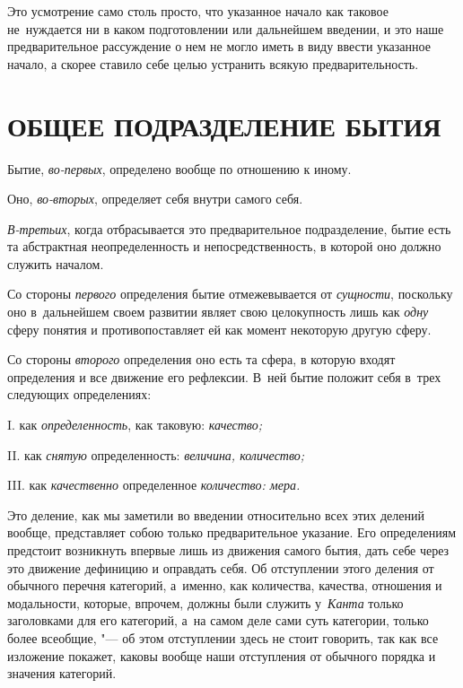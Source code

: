 Это усмотрение само столь просто, что указанное начало как таковое
не~нуждается ни в каком подготовлении или дальнейшем введении, и это наше
предварительное рассуждение о нем не могло иметь в виду ввести указанное
начало, а скорее ставило себе целью устранить всякую предварительность.

\section[\hspace{8mm}Общее подразделение бытия]{ОБЩЕЕ ПОДРАЗДЕЛЕНИЕ БЫТИЯ}

Бытие, {\em во-первых}, определено вообще по отношению к иному.

Оно, {\em во-вторых}, определяет себя внутри самого себя.

{\em В-третьих}, когда отбрасывается это предварительное
подразделение, бытие есть та абстрактная неопределенность и
непосредственность, в которой оно должно служить началом.

Со стороны {\em первого} определения бытие отмежевывается от {\em сущности},
поскольку оно в~дальнейшем своем развитии являет свою целокупность лишь как
{\em одну} сферу понятия и противопоставляет ей как момент
некоторую другую сферу.

Со стороны {\em второго} определения оно есть та сфера, в которую входят
определения и все движение его рефлексии. В~ней бытие положит себя в~трех
следующих определениях:

I. как {\em определенность}, как таковую: {\em качество;}

II. как {\em снятую} определенность: {\em величина, количество;}

III. как {\em качественно} определенное {\em количество: мера.}

Это деление, как мы заметили во введении относительно всех этих делений вообще,
представляет собою только предварительное указание. Его определениям предстоит
возникнуть впервые лишь из движения самого бытия, дать себе через это движение
дефиницию и оправдать себя. Об отступлении этого деления от обычного перечня
категорий, а~именно, как количества, качества, отношения и модальности,
которые, впрочем, должны были служить у~{\em Канта} только заголовками для его
категорий, а~на самом деле сами суть категории, только более всеобщие, "--- об
этом отступлении здесь не стоит говорить, так как все изложение покажет, каковы
вообще наши отступления от обычного порядка и значения категорий.

